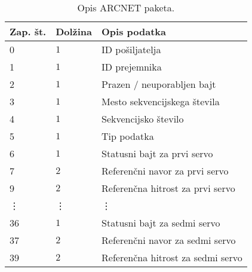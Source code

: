 
\begin{table}[h]
	\centering
	\begin{footnotesize}
		\begin{tabular}{|l l l |}
		\hline
		Zap. \v{s}t. & Dol\v{z}ina & Opis podatka\\ \hline
		0 & $1$ & ID po\v{s}iljatelja\\
		1 & $1$ & ID prejemnika\\
		2 & $1$ & Prazen / neuporabljen bajt\\
		3 & $1$ & Mesto sekvencijskega \v{s}tevila\\
		4 & $1$ & Sekvencijsko \v{s}tevilo\\
		5 & $1$ & Tip podatka\\
		6 & $1$ & Statusni bajt za prvi servo\\ 
		7 & $2$ & Referen\v{c}ni navor za prvi servo\\ 
		9 & $2$ & Referen\v{c}na hitrost za prvi servo\\ 
		\vdots& \vdots &\vdots \\
		36 & $1$ & Statusni bajt za sedmi servo\\ 
		37 & $2$ & Referen\v{c}ni navor za sedmi servo\\ 
		39 & $2$ & Referen\v{c}na hitrost za sedmi servo\\ \hline
		\end{tabular}
	\end{footnotesize}
	\caption{Opis ARCNET paketa.}
	\label{table:arcnet-command}
\end{table}